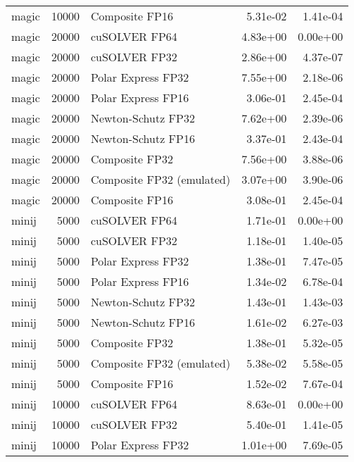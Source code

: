 \begin{table}
\begin{tabular}{lrlrr}
    magic & 10000 &            Composite FP16 &  5.31e-02 &        1.41e-04 \\
    magic & 20000 &             cuSOLVER FP64 &  4.83e+00 &        0.00e+00 \\
    magic & 20000 &             cuSOLVER FP32 &  2.86e+00 &        4.37e-07 \\
    magic & 20000 &        Polar Express FP32 &  7.55e+00 &        2.18e-06 \\
    magic & 20000 &        Polar Express FP16 &  3.06e-01 &        2.45e-04 \\
    magic & 20000 &        Newton-Schutz FP32 &  7.62e+00 &        2.39e-06 \\
    magic & 20000 &        Newton-Schutz FP16 &  3.37e-01 &        2.43e-04 \\
    magic & 20000 &            Composite FP32 &  7.56e+00 &        3.88e-06 \\
    magic & 20000 & Composite FP32 (emulated) &  3.07e+00 &        3.90e-06 \\
    magic & 20000 &            Composite FP16 &  3.08e-01 &        2.45e-04 \\
    minij &  5000 &             cuSOLVER FP64 &  1.71e-01 &        0.00e+00 \\
    minij &  5000 &             cuSOLVER FP32 &  1.18e-01 &        1.40e-05 \\
    minij &  5000 &        Polar Express FP32 &  1.38e-01 &        7.47e-05 \\
    minij &  5000 &        Polar Express FP16 &  1.34e-02 &        6.78e-04 \\
    minij &  5000 &        Newton-Schutz FP32 &  1.43e-01 &        1.43e-03 \\
    minij &  5000 &        Newton-Schutz FP16 &  1.61e-02 &        6.27e-03 \\
    minij &  5000 &            Composite FP32 &  1.38e-01 &        5.32e-05 \\
    minij &  5000 & Composite FP32 (emulated) &  5.38e-02 &        5.58e-05 \\
    minij &  5000 &            Composite FP16 &  1.52e-02 &        7.67e-04 \\
    minij & 10000 &             cuSOLVER FP64 &  8.63e-01 &        0.00e+00 \\
    minij & 10000 &             cuSOLVER FP32 &  5.40e-01 &        1.41e-05 \\
    minij & 10000 &        Polar Express FP32 &  1.01e+00 &        7.69e-05 \\

\end{tabular}
\end{table}
